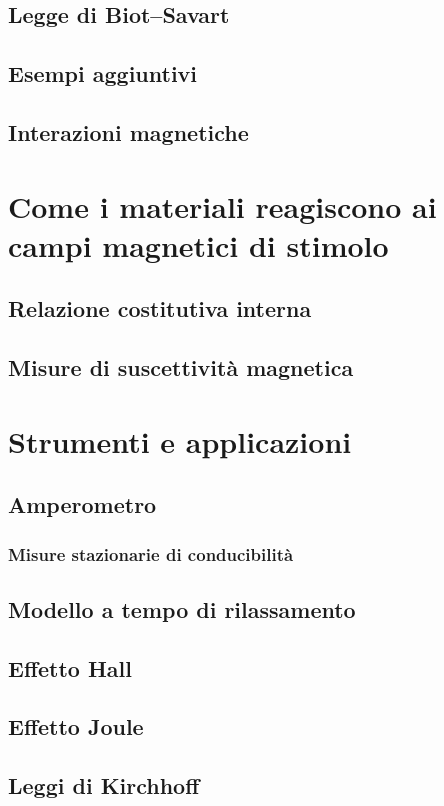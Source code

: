 \documentclass{book}
\begin{document}
\section{Legge di Biot--Savart}
\section{Esempi aggiuntivi}
\section{Interazioni magnetiche}

\chapter{Come i materiali reagiscono ai campi magnetici di stimolo}
\section{Relazione costitutiva interna}
\section{Misure di suscettivit\`a magnetica}

\chapter{Strumenti e applicazioni}
\section{Amperometro}
\subsection{Misure stazionarie di conducibilit\`a}
\section{Modello a tempo di rilassamento}
\section{Effetto Hall}
\section{Effetto Joule}
\section{Leggi di Kirchhoff}
\end{document}
